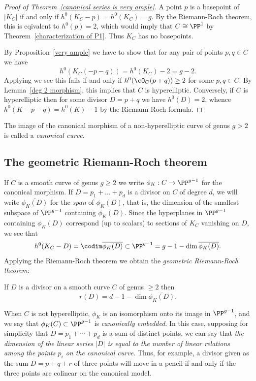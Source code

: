 \begin{proof}[Proof of Theorem~\ref{canonical series is very ample}]
A point $p$ is a basepoint of $|K_C|$ if and only if $h^0(K_C-p) = h^0(K_C) = g$. By the Riemann-Roch theorem,
this is eqivalent to $h^0(p) =2$, which would imply that $C\cong \PP^1$ by Theorem~\ref{characterization of P1}. Thus $K_C$
has no basepoints.

By Proposition~\ref{very ample} we have to show that for any pair of points $p, q \in C$ we have
$$
h^0(K_C(-p-q)) = h^0(K_C)-2 = g-2.
$$
Applying \trr we see this fails if and only if $h^0(\cO_C(p+q)) \geq 2$ for some $p,q \in C$. By Lemma~\ref{deg 2 morphism}, this implies that $C$ is hyperelliptic. Conversely, if $C$ is hyperelliptic then for some divisor $D = p+q$ we have $h^0(D) = 2$, whence $h^0(K-p-q) = h^0(K) -1$ by
the Riemann-Roch formula.
\end{proof}

The image of the canonical morphism of a non-hyperelliptic curve of genus $g>2$ is called a \emph{canonical curve}.


\subsection{The geometric Riemann-Roch theorem}

If $C$ is a smooth curve of genus $g\geq 2$ we write $\phi_K: C\to \PP^{g-1}$ for the canonical morphism.
If  $D = p_1+\dots + p_d$ is a divisor on $C$ of degree $d$, we will write $\overline{ \phi_K(D)}$ for the \emph{span}
of  $\phi_K(D)$, that is, the dimension of the smallest  subspace of $\PP^{g-1}$ containing $\phi_K(D)$. Since the hyperplanes in $\PP^{g-1}$ containing $\phi_K(D)$ correspond (up to scalars) to sections of $K_C$ vanishing on $D$, we see that
$$
h^0(K_C-D) = \codim \overline{ \phi_K(D)} \subset \PP^{g-1}= g - 1 - \dim \overline{ \phi_K(D)}.
$$
Applying the Riemann-Roch theorem we obtain  the \emph{geometric Riemann-Roch theorem}:

\begin{corollary}\label{geometric RR}
If $D$ is a divisor on a smooth curve $C$ of genus $\geq 2$ then
$$
r(D) = d - 1 - \dim \overline{ \phi_K(D)}.
$$
\end{corollary}

When $C$ is not hyperelliptic, $\phi_K$ is an isomorphism onto its image in $\PP^{g-1}$, and we say that $ \phi_K(C)\subset \PP^{g-1}$ is \emph{canonically embedded}. In this case, supposing for simplicity that $D = p_1+\cdots+p_d$ is a sum of distinct points, we can say that \emph{the dimension of the linear series $|D|$  is equal to the number of linear relations among the points $p_i$ on the canonical curve}. Thus, for example, a divisor given as the sum $D = p+q+r$ of three points will move in a pencil if and only if the three points are colinear on the canonical model.

